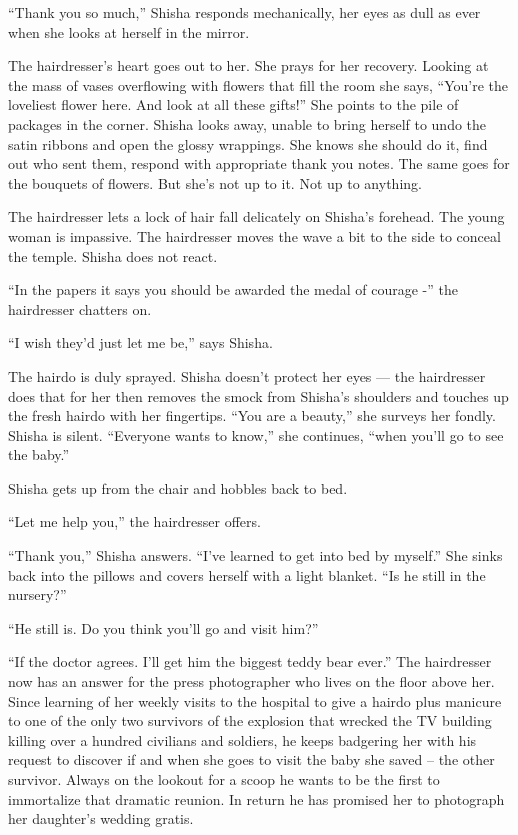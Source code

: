 \documentclass[twoside,11pt]{book}
\begin{document}
``Thank you so much,'' Shisha responds mechanically, her eyes as dull as ever when she looks
at herself in the mirror.

The hairdresser's heart goes out to her. She prays for her recovery. Looking at the mass of vases overflowing with
flowers that fill the room she says, ``You're the loveliest flower here. And look at all these
gifts!'' She points to the pile of packages in the corner. Shisha looks away, unable to bring herself to
undo the satin ribbons and open the glossy wrappings. She knows she should do it, find out who sent them, respond
with appropriate thank you notes. The same goes for the bouquets of flowers. But she's not up to it. Not up to
anything.

The hairdresser lets a lock of hair fall delicately on Shisha's forehead. The young woman is impassive. The hairdresser
moves the wave a bit to the side to conceal the temple. Shisha does not react.

``In the papers it says you should be awarded the medal of courage -'' the hairdresser
chatters on.

``I wish they'd just let me be,'' says Shisha{.}

The hairdo is duly sprayed. Shisha doesn't protect her eyes
--- the hairdresser does that for her then removes the smock from
Shisha's shoulders and touches up the fresh hairdo with her fingertips. ``You are a beauty,''
she surveys her fondly. Shisha is silent. ``Everyone wants to know,'' she continues, ``when you'll go to
see the baby.''

Shisha gets up from the chair and hobbles back to bed.

``Let me help you,'' the hairdresser offers.

``Thank you,'' Shisha answers. ``I've learned to get into bed by
myself.'' She sinks back into the pillows and covers herself with a light blanket. ``Is he
still in the nursery?''

``He still is. Do you think you'll go and visit him?''

``If the doctor agrees. I'll get him the biggest teddy bear ever.'' The hairdresser now has an
answer for the press photographer who lives on the floor above her. Since learning of her weekly visits to the hospital
to give a hairdo plus manicure to one of the only two survivors of the explosion that wrecked the TV building killing
over a hundred civilians and soldiers, he keeps badgering her with his request to discover if and when she goes to
visit the baby she saved -- the other survivor. Always on the lookout for a scoop he wants to be the first to
immortalize that dramatic reunion. In return he has promised her to photograph her daughter's wedding gratis.
\end{document}
